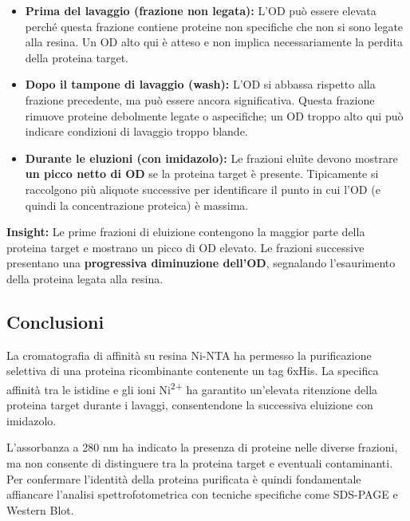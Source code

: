 \begin{itemize}\footnotesize
  \item \textbf{Prima del lavaggio (frazione non legata):}  
  L’OD può essere elevata perché questa frazione contiene proteine non specifiche che non si sono legate alla resina.  
  Un OD alto qui è atteso e non implica necessariamente la perdita della proteina target.

  \item \textbf{Dopo il tampone di lavaggio (wash):}  
  L’OD si abbassa rispetto alla frazione precedente, ma può essere ancora significativa.  
  Questa frazione rimuove proteine debolmente legate o aspecifiche; un OD troppo alto qui può indicare condizioni di lavaggio troppo blande.

  \item \textbf{Durante le eluzioni (con imidazolo):}  
  Le frazioni eluìte devono mostrare \textbf{un picco netto di OD} se la proteina target è presente.  
  Tipicamente si raccolgono più aliquote successive per identificare il punto in cui l’OD (e quindi la concentrazione proteica) è massima.
\end{itemize}

\begin{insightBox}\footnotesize
	\textbf{Insight:} Le prime frazioni di eluizione contengono la maggior parte della proteina target e mostrano un picco di OD elevato.  
	Le frazioni successive presentano una \textbf{progressiva diminuzione dell’OD}, segnalando l’esaurimento della proteina legata alla resina.
\end{insightBox}



\subsection{Conclusioni}
La cromatografia di affinità su resina Ni-NTA ha permesso la purificazione selettiva di una proteina ricombinante contenente un tag 6xHis.  
La specifica affinità tra le istidine e gli ioni Ni\textsuperscript{2+} ha garantito un’elevata ritenzione della proteina target durante i lavaggi, consentendone la successiva eluizione con imidazolo.

L’assorbanza a 280 nm ha indicato la presenza di proteine nelle diverse frazioni, ma non consente di distinguere tra la proteina target e eventuali contaminanti.  
Per confermare l’identità della proteina purificata è quindi fondamentale affiancare l’analisi spettrofotometrica con tecniche specifiche come SDS-PAGE e Western Blot.
\restoregeometry
\newpage